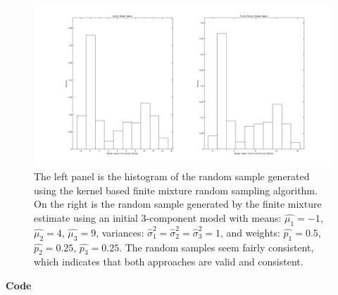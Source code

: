 \documentclass[12pt,a4paper]{article}
\begin{document}
\begin{figure}[ht!] 
\begin{center}
\includegraphics[scale=.35]{inclass7p1_graph3}
\caption{The left panel is the histogram of the random sample generated using the kernel based finite mixture random sampling algorithm. On the right is the random sample generated by the finite mixture estimate using an initial 3-component model with means: $\hat{\mu_1}=-1$, $\hat{\mu_2}=4$,  $\hat{\mu_3}=9$, variances: $\hat{\sigma}_1^2=\hat{\sigma}_2^2=\hat{\sigma}_3^2=1$, and weights: $\hat{p_1}=0.5$, $\hat{p_2}=0.25$,  $\hat{p_3}=0.25$. The random samples seem fairly consistent, which indicates that both approaches are valid and consistent.
}
\label{inclass fig2}
\end{center}
\end{figure}
\FloatBarrier
\textbf{Code}
\end{document}
